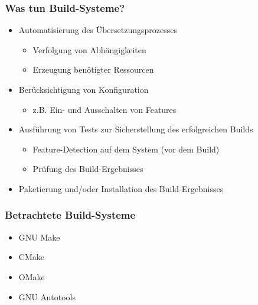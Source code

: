 \begin{frame}
	\frametitle{Was tun Build-Systeme?}
	\begin{itemize}
		\pause
		\item Automatisierung des Übersetzungsprozesses
			\begin{itemize}
				\pause
				\item Verfolgung von Abhängigkeiten
				\pause
				\item Erzeugung benötigter Ressourcen
			\end{itemize}
		\pause
		\item Berücksichtigung von Konfiguration
			\begin{itemize}
			\pause
			\item z.B. Ein- und Ausschalten von Features
			\end{itemize}
		\pause
		\item Ausführung von Tests zur Sicherstellung des erfolgreichen Builds
		\begin{itemize}
			\pause
			\item Feature-Detection auf dem System (vor dem Build)
			\pause
			\item Prüfung des Build-Ergebnisses
		\end{itemize}
		\pause
		\item Paketierung und/oder Installation des Build-Ergebnisses
	\end{itemize}
\end{frame}

\begin{frame}
	\frametitle{Betrachtete Build-Systeme}
	\begin{itemize}
		\item GNU Make
		\item CMake
		\item OMake
		\item GNU Autotools
	\end{itemize}
\end{frame}
